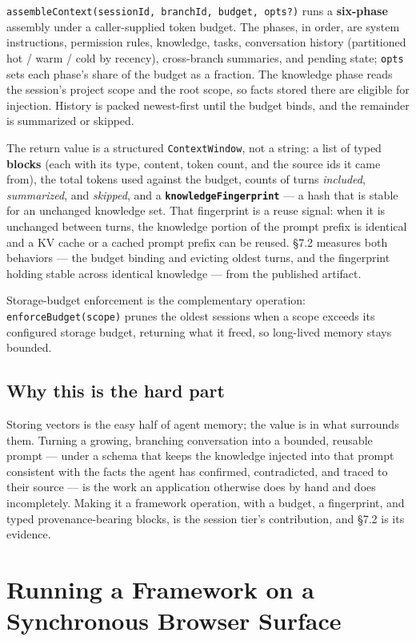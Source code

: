 \documentclass[11pt]{article}
\newcommand{\code}[1]{\texttt{#1}}
\begin{document}
\code{assembleContext(sessionId, branchId, budget, opts?)} runs a
\textbf{six-phase} assembly under a caller-supplied token budget. The phases, in
order, are system instructions, permission rules, knowledge, tasks, conversation
history (partitioned hot / warm / cold by recency), cross-branch summaries, and
pending state; \code{opts} sets each phase's share of the budget as a fraction. The
knowledge phase reads the session's project scope and the root scope, so facts
stored there are eligible for injection. History is packed newest-first until the
budget binds, and the remainder is summarized or skipped.

The return value is a structured \code{ContextWindow}, not a string: a list of
typed \textbf{blocks} (each with its type, content, token count, and the source
ids it came from), the total tokens used against the budget, counts of turns
\emph{included}, \emph{summarized}, and \emph{skipped}, and a
\textbf{\code{knowledgeFingerprint}} --- a hash that is stable for an unchanged
knowledge set. That fingerprint is a reuse signal: when it is unchanged between
turns, the knowledge portion of the prompt prefix is identical and a KV cache or a
cached prompt prefix can be reused. \S7.2 measures both behaviors --- the budget
binding and evicting oldest turns, and the fingerprint holding stable across
identical knowledge --- from the published artifact.

Storage-budget enforcement is the complementary operation:
\code{enforceBudget(scope)} prunes the oldest sessions when a scope exceeds its
configured storage budget, returning what it freed, so long-lived memory stays
bounded.

\subsection{Why this is the hard part}

Storing vectors is the easy half of agent memory; the value is in what surrounds
them. Turning a growing, branching conversation into a bounded, reusable prompt ---
under a schema that keeps the knowledge injected into that prompt consistent with
the facts the agent has confirmed, contradicted, and traced to their source --- is
the work an application otherwise does by hand and does incompletely. Making it a
framework operation, with a budget, a fingerprint, and typed provenance-bearing
blocks, is the session tier's contribution, and \S7.2 is its evidence.

\section{Running a Framework on a Synchronous Browser Surface}
\end{document}
